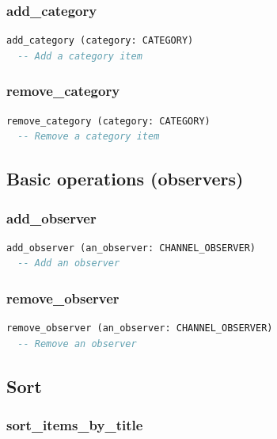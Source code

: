 \subsubsection{add\_category}

\begin{lstlisting}[language=Eiffel]
add_category (category: CATEGORY)
  -- Add a category item
\end{lstlisting}

\subsubsection{remove\_category}

\begin{lstlisting}[language=Eiffel]
remove_category (category: CATEGORY)
  -- Remove a category item
\end{lstlisting}

\subsection{Basic operations (observers)}
\label{sec:channel-basic-operations-observer}

\subsubsection{add\_observer}

\begin{lstlisting}[language=Eiffel]
add_observer (an_observer: CHANNEL_OBSERVER)
  -- Add an observer
\end{lstlisting}

\subsubsection{remove\_observer}

\begin{lstlisting}[language=Eiffel]
remove_observer (an_observer: CHANNEL_OBSERVER)
  -- Remove an observer
\end{lstlisting}

\subsection{Sort}
\label{sec:channel-sort}

\subsubsection{sort\_items\_by\_title}

